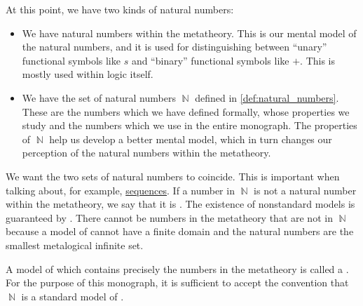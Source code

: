 \begin{remark}\label{rem:standard_models_of_arithmetic}
  At this point, we have two kinds of natural numbers:
  \begin{itemize}
    \item We have natural numbers within the metatheory. This is our mental model of the natural numbers, and it is used for distinguishing between \enquote{unary} functional symbols like \( s \) and \enquote{binary} functional symbols like \( + \). This is mostly used within logic itself.

    \item We have the set of natural numbers \( \BbbN \) defined in \cref{def:natural_numbers}. These are the numbers which we have defined formally, whose properties we study and the numbers which we use in the entire monograph. The properties of \( \BbbN \) help us develop a better mental model, which in turn changes our perception of the natural numbers within the metatheory.
  \end{itemize}

  We want the two sets of natural numbers to coincide. This is important when talking about, for example, \hyperref[def:sequence]{sequences}. If a number in \( \BbbN \) is not a natural number within the metatheory, we say that it is . The existence of nonstandard models is guaranteed by . There cannot be numbers in the metatheory that are not in \( \BbbN \) because a model of  cannot have a finite domain and the natural numbers are the smallest metalogical infinite set.

  A model of  which contains precisely the numbers in the metatheory is called a . For the purpose of this monograph, it is sufficient to accept the convention that \( \BbbN \) is a standard model of .
\end{remark}

